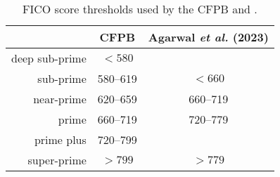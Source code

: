 \begin{table}[t!]
    \centering
    \begin{tabular}{ r c c } 
        \hline
        & CFPB & Agarwal \emph{et al.} (2023) \\ 
        \hline
        deep sub-prime & $<580$ & \\
        sub-prime & 580--619 & $<660$ \\ 
        near-prime & 620--659  & 660--719 \\ 
        prime & 660--719 & 720--779 \\ 
        prime plus & 720--799 & \\
        super-prime & $>799$ & $>779$ \\ 
        \hline
    \end{tabular}
    \caption{FICO score thresholds used by the CFPB and \citet{agaretal:2023}.}
    \label{tab:FICO}
\end{table}
